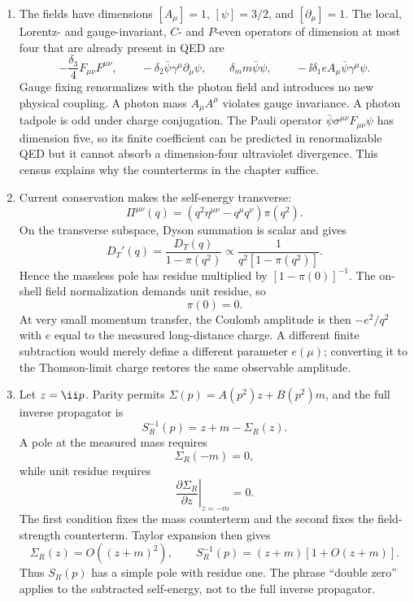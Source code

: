 \begin{enumerate}
\begin{enumerate}
\item
The fields have dimensions
\([A_\mu]=1\), \([\psi]=3/2\), and \([\partial_\mu]=1\).  The local,
Lorentz- and gauge-invariant, \(C\)- and \(P\)-even operators of dimension at
most four that are already present in QED are
\[
 -\frac{\delta_3}{4}F_{\mu\nu}F^{\mu\nu},\qquad
 -\delta_2\bar\psi\gamma^\mu\partial_\mu\psi,\qquad
 \delta_m m\bar\psi\psi,\qquad
 -\ii\delta_1eA_\mu\bar\psi\gamma^\mu\psi.
\]
Gauge fixing renormalizes with the photon field and introduces no new
physical coupling.  A photon mass \(A_\mu A^\mu\) violates gauge
invariance.  A photon tadpole is odd under charge conjugation.  The Pauli
operator \(\bar\psi\sigma^{\mu\nu}F_{\mu\nu}\psi\) has dimension five, so
its finite coefficient can be predicted in renormalizable QED but it cannot
absorb a dimension-four ultraviolet divergence.  This census explains why
the counterterms in the chapter suffice.
\item
Current conservation makes the self-energy transverse:
\[
 \Pi^{\mu\nu}(q)
 =(q^2\eta^{\mu\nu}-q^\mu q^\nu)\pi(q^2).
\]
On the transverse subspace, Dyson summation is scalar and gives
\[
 D_T'(q)=\frac{D_T(q)}{1-\pi(q^2)}
 \propto\frac{1}{q^2[1-\pi(q^2)]}.
\]
Hence the massless pole has residue multiplied by
\([1-\pi(0)]^{-1}\).  The on-shell field normalization demands unit
residue, so
\[
 \boxed{\pi(0)=0.}
\]
At very small momentum transfer, the Coulomb amplitude is then
\(-e^2/q^2\) with \(e\) equal to the measured long-distance charge.  A
different finite subtraction would merely define a different parameter
\(e(\mu)\); converting it to the Thomson-limit charge restores the same
observable amplitude.
\item
Let \(z=\ii\sl p\).  Parity permits
\(\Sigma(p)=A(p^2)z+B(p^2)m\), and the full inverse propagator is
\[
 S_R^{-1}(p)=z+m-\Sigma_R(z).
\]
A pole at the measured mass requires
\[
 \boxed{\Sigma_R(-m)=0,}
\]
while unit residue requires
\[
 \boxed{\left.\frac{\partial\Sigma_R}{\partial z}\right|_{z=-m}=0.}
\]
The first condition fixes the mass counterterm and the second fixes the
field-strength counterterm.  Taylor expansion then gives
\[
 \Sigma_R(z)=O((z+m)^2),\qquad
 S_R^{-1}(p)=(z+m)[1+O(z+m)].
\]
Thus \(S_R(p)\) has a simple pole with residue one.  The phrase ``double
zero'' applies to the subtracted self-energy, not to the full inverse
propagator.
\end{enumerate}


\end{enumerate}
